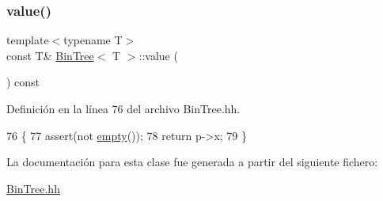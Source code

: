 \subsubsection{\texorpdfstring{value()}{value()}}
{\footnotesize\ttfamily template$<$typename T$>$ \\
const T\& \mbox{\hyperlink{class_bin_tree}{Bin\+Tree}}$<$ T $>$\+::value (\begin{DoxyParamCaption}{ }\end{DoxyParamCaption}) const}



Definición en la línea 76 del archivo Bin\+Tree.\+hh.


\begin{DoxyCode}
76                             \{
77         assert(not \mbox{\hyperlink{class_bin_tree_a74cda259ba5c25b8ee38ed4dc33e4fad}{empty}}());
78         \textcolor{keywordflow}{return} p->x;
79     \}
\end{DoxyCode}


La documentación para esta clase fue generada a partir del siguiente fichero\+:\begin{DoxyCompactItemize}
\item 
\mbox{\hyperlink{_bin_tree_8hh}{Bin\+Tree.\+hh}}\end{DoxyCompactItemize}
